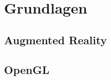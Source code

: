 \chapter{Grundlagen}\label{chapter:Grundlagen}


\section{Augmented Reality}\label{AR}
\section{OpenGL}\label{OpenGL}

